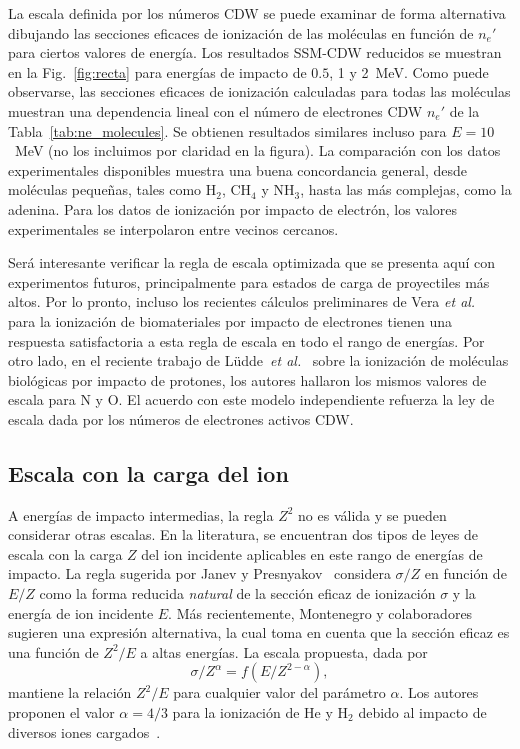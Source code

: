 La escala definida por los números CDW se puede examinar de forma 
alternativa dibujando las secciones eficaces de ionización de las 
moléculas en función de $n_e'$ para ciertos valores de energía. Los 
resultados SSM-CDW reducidos se muestran en la Fig.~\ref{fig:recta} para 
energías de impacto de $0.5$, 1 y 2~MeV. Como puede observarse, las 
secciones eficaces de ionización calculadas para todas las moléculas 
muestran una dependencia lineal con el número de electrones CDW $n_e'$ 
de la Tabla~\ref{tab:ne_molecules}. Se obtienen resultados similares 
incluso para $E=10$~MeV (no los incluimos por claridad en la figura). La 
comparación con los datos experimentales disponibles muestra una buena 
concordancia general, desde moléculas pequeñas, tales como H$_2$, CH$_4$ 
y NH$_3$, hasta las más complejas, como la adenina. Para los datos de 
ionización por impacto de electrón, los valores experimentales se 
interpolaron entre vecinos cercanos. 

Será interesante verificar la regla de escala optimizada que se presenta
aquí con experimentos futuros, principalmente para estados de carga de 
proyectiles más altos. Por lo pronto, incluso los recientes cálculos 
preliminares de Vera \textit{et al.}~\cite{deVera:20} para la ionización 
de biomateriales por impacto de electrones tienen una respuesta 
satisfactoria a esta regla de escala en todo el rango de energías.
Por otro lado, en el reciente trabajo de 
L\"udde~\textit{et al.}~\cite{ludde2019} sobre la ionización de 
moléculas biológicas por impacto de protones, los autores hallaron los 
mismos valores de escala para N y O. El acuerdo con este modelo 
independiente refuerza la ley de escala dada por los números de 
electrones activos CDW.

\subsection{Escala con la carga del ion}
\label{sec:zscaling}

A energías de impacto intermedias, la regla $Z^2$ no es válida y se 
pueden considerar otras escalas. En la literatura, se encuentran dos 
tipos de leyes de escala con la carga $Z$ del ion incidente aplicables 
en este rango de energías de impacto. La regla sugerida por Janev y 
Presnyakov~\cite{Janev:80} considera $\sigma/Z$ en función de $E/Z$ como 
la forma reducida \textit{natural} de la sección eficaz de ionización 
$\sigma$ y la energía de ion incidente $E$. Más recientemente, 
Montenegro y colaboradores~\cite{Dubois:13,Montenegro:13} sugieren una 
expresión alternativa, la cual toma en cuenta que la sección eficaz es 
una función de $Z^2/E$ a altas energías. La escala propuesta, dada por
\begin{equation}
 \sigma/Z^{\alpha}=f(E/Z^{2-\alpha}),
\label{eq:Montenegro}
\end{equation}
mantiene la relación $Z^2/E$ para cualquier valor del parámetro 
$\alpha$. Los autores proponen el valor $\alpha=4/3$ para la ionización 
de He y H$_2$ debido al impacto de diversos iones 
cargados~\cite{Dubois:13}. 

